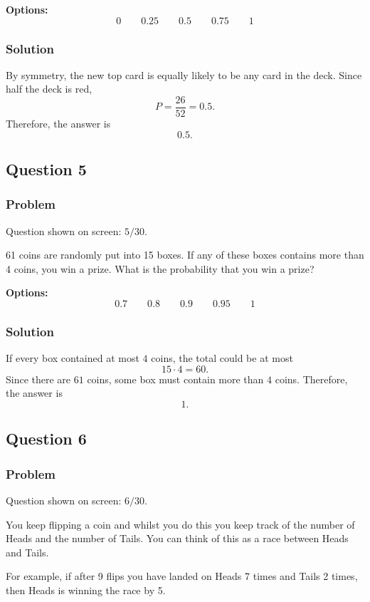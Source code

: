 \documentclass[12pt]{article}
\begin{document}
\noindent\textbf{Options:}
\[
\boxed{0}
\qquad
\boxed{0.25}
\qquad
\boxed{0.5}
\qquad
\boxed{0.75}
\qquad
\boxed{1}
\]

\subsubsection{Solution}
By symmetry, the new top card is equally likely to be any card in the deck. Since half the deck is red,
\[
P=\frac{26}{52}=0.5.
\]
Therefore, the answer is
\[
\boxed{0.5}.
\]

\subsection{Question 5}
\subsubsection{Problem}
Question shown on screen: \(5/30\).

61 coins are randomly put into 15 boxes. If any of these boxes contains more than 4 coins, you win a prize. What is the probability that you win a prize?

\noindent\textbf{Options:}
\[
\boxed{0.7}
\qquad
\boxed{0.8}
\qquad
\boxed{0.9}
\qquad
\boxed{0.95}
\qquad
\boxed{1}
\]

\subsubsection{Solution}
If every box contained at most \(4\) coins, the total could be at most
\[
15\cdot 4=60.
\]
Since there are \(61\) coins, some box must contain more than \(4\) coins. Therefore, the answer is
\[
\boxed{1}.
\]

\subsection{Question 6}
\subsubsection{Problem}
Question shown on screen: \(6/30\).

You keep flipping a coin and whilst you do this you keep track of the number of Heads and the number of Tails. You can think of this as a race between Heads and Tails.

For example, if after 9 flips you have landed on Heads 7 times and Tails 2 times, then Heads is winning the race by 5.
\end{document}
